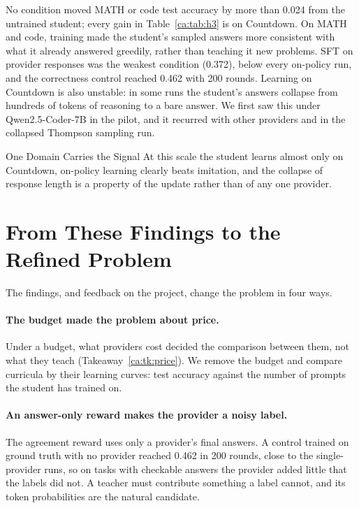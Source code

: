 No condition moved MATH or code test accuracy by more than 0.024 from the untrained student;
every gain in Table~\ref{ca:tab:h3} is on Countdown. On MATH and code, training made the
student's sampled answers more consistent with what it already answered greedily, rather
than teaching it new problems. SFT on provider responses was the weakest condition (0.372),
below every on-policy run, and the correctness control reached 0.462 with 200 rounds.
Learning on Countdown is also unstable: in some runs the student's answers collapse from
hundreds of tokens of reasoning to a bare answer. We first saw this under Qwen2.5-Coder-7B
in the pilot, and it recurred with other providers and in the collapsed Thompson sampling
run.

\begin{takeaway}{One Domain Carries the Signal}
\label{ca:tk:countdown}
At this scale the student learns almost only on Countdown, on-policy learning clearly beats
imitation, and the collapse of response length is a property of the update rather than of
any one provider.
\end{takeaway}

\section{From These Findings to the Refined Problem}
\label{ca:sec:refined}

The findings, and feedback on the project, change the problem in four ways.

\paragraph{The budget made the problem about price.} Under a budget, what
providers cost decided the comparison between them, not what they teach
(Takeaway~\ref{ca:tk:price}). We remove the budget and compare curricula by their learning
curves: test accuracy against the number of prompts the student has trained on.

\paragraph{An answer-only reward makes the provider a noisy label.} The agreement reward
uses only a provider's final answers. A control trained on ground truth with no provider
reached 0.462 in 200 rounds, close to the single-provider runs, so on tasks with checkable
answers the provider added little that the labels did not. A teacher must contribute
something a label cannot, and its token probabilities are the natural candidate.

